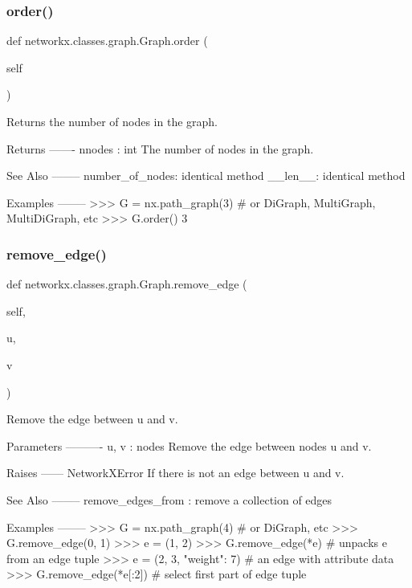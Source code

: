 \subsubsection{\texorpdfstring{order()}{order()}}
{\footnotesize\ttfamily def networkx.\+classes.\+graph.\+Graph.\+order (\begin{DoxyParamCaption}\item[{}]{self }\end{DoxyParamCaption})}

\begin{DoxyVerb}Returns the number of nodes in the graph.

Returns
-------
nnodes : int
    The number of nodes in the graph.

See Also
--------
number_of_nodes: identical method
__len__: identical method

Examples
--------
>>> G = nx.path_graph(3)  # or DiGraph, MultiGraph, MultiDiGraph, etc
>>> G.order()
3
\end{DoxyVerb}
 \mbox{\label{classnetworkx_1_1classes_1_1graph_1_1Graph_a59b6121505c67e1e3b75b490eb93ede2}} 
\subsubsection{\texorpdfstring{remove\+\_\+edge()}{remove\_edge()}}
{\footnotesize\ttfamily def networkx.\+classes.\+graph.\+Graph.\+remove\+\_\+edge (\begin{DoxyParamCaption}\item[{}]{self,  }\item[{}]{u,  }\item[{}]{v }\end{DoxyParamCaption})}

\begin{DoxyVerb}Remove the edge between u and v.

Parameters
----------
u, v : nodes
    Remove the edge between nodes u and v.

Raises
------
NetworkXError
    If there is not an edge between u and v.

See Also
--------
remove_edges_from : remove a collection of edges

Examples
--------
>>> G = nx.path_graph(4)  # or DiGraph, etc
>>> G.remove_edge(0, 1)
>>> e = (1, 2)
>>> G.remove_edge(*e)  # unpacks e from an edge tuple
>>> e = (2, 3, {"weight": 7})  # an edge with attribute data
>>> G.remove_edge(*e[:2])  # select first part of edge tuple
\end{DoxyVerb}
 \mbox{\label{classnetworkx_1_1classes_1_1graph_1_1Graph_a0b13e6305a4d214a3c9d40c8e8253fdb}} 
